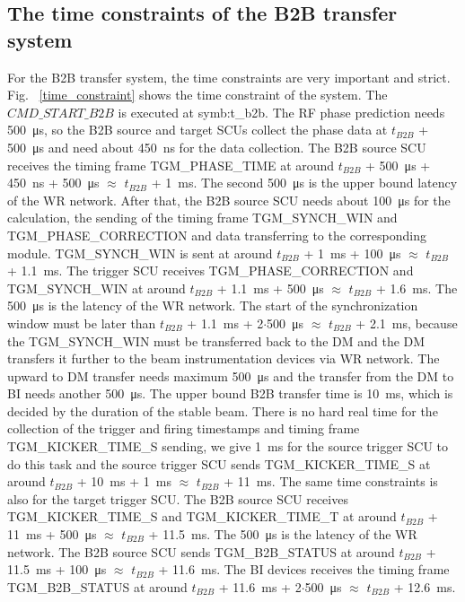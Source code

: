 \subsection{The time constraints of the B2B transfer system}
For the B2B transfer system, the time constraints are very important and strict. Fig. ~\ref{time_constraint} shows the time constraint of the system. The $CMD\_START\_B2B$ is executed at \gls{symb:t_b2b}. The RF phase prediction needs \SI{500}{\us}, so the B2B source and target SCUs collect the phase data at $t_{B2B}$ + \SI{500}{\us} and need about \SI{450}{\ns} for the data collection. The B2B source SCU receives the timing frame TGM\_PHASE\_TIME at around $t_{B2B}$ + \SI{500}{\us} + \SI{450}{\ns} + \SI{500}{\us} $\approx$ $t_{B2B}$ + \SI{1}{\ms}. The second \SI{500}{\us} is the upper bound latency of the WR network. After that, the B2B source SCU needs about \SI{100}{\us} for the calculation, the sending of the timing frame TGM\_SYNCH\_WIN and TGM\_PHASE\_CORRECTION and data transferring to the corresponding module. TGM\_SYNCH\_WIN is sent at around $t_{B2B}$ + \SI{1}{\ms} + \SI{100}{\us} $\approx$ $t_{B2B}$ + \SI{1.1}{\ms}. The trigger SCU receives TGM\_PHASE\_CORRECTION and TGM\_SYNCH\_WIN at around $t_{B2B}$ + \SI{1.1}{\ms} + \SI{500}{\us} $\approx$ $t_{B2B}$ + \SI{1.6}{\ms}. The \SI{500}{\us} is the latency of the WR network. The start of the synchronization window must be later than $t_{B2B}$ + \SI{1.1}{\ms} + 2$\cdot$\SI{500}{\us} $\approx$ $t_{B2B}$ + \SI{2.1}{\ms}, because the TGM\_SYNCH\_WIN must be transferred back to the DM and the DM transfers it further to the beam instrumentation devices via WR network. The upward to DM transfer needs maximum \SI{500}{\us} and the transfer from the DM to BI needs another \SI{500}{\us}.  The upper bound B2B transfer time is \SI{10}{\ms}, which is decided by the duration of the stable beam. There is no hard real time for the collection of the trigger and firing timestamps and timing frame TGM\_KICKER\_TIME\_S sending, we give \SI{1}{\ms} for the source trigger SCU to do this task and the source trigger SCU sends TGM\_KICKER\_TIME\_S at around $t_{B2B}$ + \SI{10}{\ms} + \SI{1}{\ms} $\approx$ $t_{B2B}$ + \SI{11}{\ms}. The same time constraints is also for the target trigger SCU. The B2B source SCU receives TGM\_KICKER\_TIME\_S and TGM\_KICKER\_TIME\_T at around $t_{B2B}$ + \SI{11}{\ms} + \SI{500}{\us} $\approx$ $t_{B2B}$ + \SI{11.5}{\ms}. The \SI{500}{\us} is the latency of the WR network. The B2B source SCU sends TGM\_B2B\_STATUS at around $t_{B2B}$ + \SI{11.5}{\ms} + \SI{100}{\us} $\approx$ $t_{B2B}$ + \SI{11.6}{\ms}. The BI devices receives the timing frame TGM\_B2B\_STATUS at around $t_{B2B}$ + \SI{11.6}{\ms} + 2$\cdot$\SI{500}{\us} $\approx$ $t_{B2B}$ + \SI{12.6}{\ms}.


